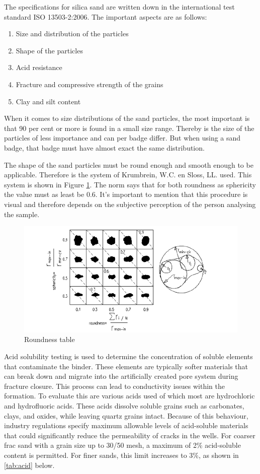 The specifications for silica sand are written down in the international test standard ISO 13503-2:2006. The important aspects are as follows:

\begin{enumerate}
    \item  Size and distribution of the particles
    \item Shape of the particles
    \item Acid resistance 
    \item Fracture and compressive strength of the grains
    \item Clay and silt content
\end{enumerate}

When it comes to size distributions of the sand particles, the most important is that 90 per cent or more is found in a small size range. Thereby is the size of the particles of less importance and can per badge differ. But when using a sand badge, that badge must have almost exact the same distribution. 

The shape of the sand particles must be round enough and smooth enough to be applicable. Therefore is the system of Krumbrein, W.C. en Sloss, LL. used. This system is shown in Figure \ref{fig:RT}. The norm says that for both roundness as sphericity the value must as least be 0.6. It's important to mention that this procedure is visual and therefore depends on the subjective perception of the person analysing the sample.

\begin{figure}[H]
    \centering
    \includegraphics[width=0.75\linewidth]{figures//ch9/roundness.png}
    \caption{Roundness table \autocite{rodriguezParticleShapeQuantities2013}}
    \label{fig:RT}
\end{figure}

Acid solubility testing is used to determine the concentration of soluble elements that contaminate the binder. These elements are typically softer materials that can break down and migrate into the artificially created pore system during fracture closure. This process can lead to conductivity issues within the formation.
To evaluate this are various acids  used of which most are hydrochloric and hydrofluoric acids. These acids dissolve soluble grains such as carbonates, clays, and oxides, while leaving quartz grains intact. Because of this behaviour, industry regulations specify maximum allowable levels of acid-soluble materials that could significantly reduce the permeability of cracks in the wells.
For coarser frac sand with a grain size up to 30/50 mesh, a maximum of 2\% acid-soluble content is permitted. For finer sands, this limit increases to 3\%, as shown in \ref{tab:acid} below.

